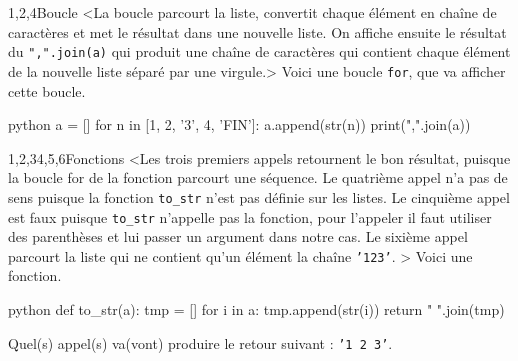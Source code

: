 \begin{quiz}[title={Boucle et fonctions}]
\begin{quizquestion}[b]{3}{1,2,4}{Boucle}
<La boucle parcourt la liste, convertit chaque élément en chaîne de caractères et met le résultat dans une nouvelle liste. On affiche ensuite le résultat du \texttt{",".join(a)} qui produit une chaîne de caractères qui contient chaque élément de la nouvelle liste séparé par une virgule.> 
Voici une boucle \texttt{for}, que va afficher cette boucle.
\begin{listingbox}{python}
a = []
for n in [1, 2, '3', 4, 'FIN']:
    a.append(str(n))
print(",".join(a))
\end{listingbox}
\vspace{6pt}
\end{quizquestion}

\begin{quizquestion}[b]{1,2,3}{4,5,6}{Fonctions}
<Les trois premiers appels retournent le bon résultat, puisque la boucle for de la fonction parcourt une séquence.
Le quatrième appel n'a pas de sens puisque la fonction \texttt{to\_str} n'est pas définie sur les listes.
Le cinquième appel est faux puisque \texttt{to\_str} n'appelle pas la fonction, pour l'appeler il faut utiliser des parenthèses et lui passer un argument dans notre cas. Le sixième appel parcourt la liste qui ne contient qu'un élément la chaîne \texttt{'123'}. > 
Voici une fonction.
\begin{listingbox}{python}
def to_str(a):
    tmp = []
    for i in a:
        tmp.append(str(i))
    return " ".join(tmp)
\end{listingbox}
\vspace{6pt}
Quel(s) appel(s) va(vont) produire le retour suivant : \texttt{'1 2 3'}.
\end{quizquestion}
\end{quiz}

